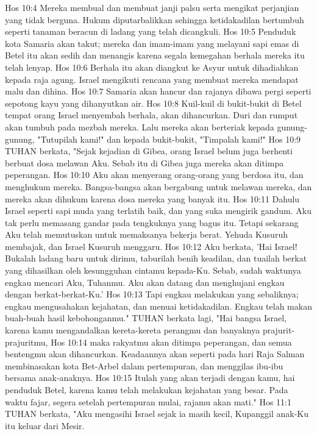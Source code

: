 Hos 10:4  Mereka membual dan membuat janji palsu serta mengikat perjanjian yang tidak berguna. Hukum diputarbalikkan sehingga ketidakadilan bertumbuh seperti tanaman beracun di ladang yang telah dicangkuli.
Hos 10:5  Penduduk kota Samaria akan takut; mereka dan imam-imam yang melayani sapi emas di Betel itu akan sedih dan menangis karena segala kemegahan berhala mereka itu telah lenyap.
Hos 10:6  Berhala itu akan diangkut ke Asyur untuk dihadiahkan kepada raja agung. Israel mengikuti rencana yang membuat mereka mendapat malu dan dihina.
Hos 10:7  Samaria akan hancur dan rajanya dibawa pergi seperti sepotong kayu yang dihanyutkan air.
Hos 10:8  Kuil-kuil di bukit-bukit di Betel tempat orang Israel menyembah berhala, akan dihancurkan. Duri dan rumput akan tumbuh pada mezbah mereka. Lalu mereka akan berteriak kepada gunung-gunung, "Tutupilah kami!" dan kepada bukit-bukit, "Timpalah kami!"
Hos 10:9  TUHAN berkata, "Sejak kejadian di Gibea, orang Israel belum juga berhenti berbuat dosa melawan Aku. Sebab itu di Gibea juga mereka akan ditimpa peperangan.
Hos 10:10  Aku akan menyerang orang-orang yang berdosa itu, dan menghukum mereka. Bangsa-bangsa akan bergabung untuk melawan mereka, dan mereka akan dihukum karena dosa mereka yang banyak itu.
Hos 10:11  Dahulu Israel seperti sapi muda yang terlatih baik, dan yang suka mengirik gandum. Aku tak perlu memasang gandar pada tengkuknya yang bagus itu. Tetapi sekarang Aku telah memutuskan untuk memaksanya bekerja berat. Yehuda Kusuruh membajak, dan Israel Kusuruh menggaru.
Hos 10:12  Aku berkata, 'Hai Israel! Bukalah ladang baru untuk dirimu, taburilah benih keadilan, dan tuailah berkat yang dihasilkan oleh kesungguhan cintamu kepada-Ku. Sebab, sudah waktunya engkau mencari Aku, Tuhanmu. Aku akan datang dan menghujani engkau dengan berkat-berkat-Ku.'
Hos 10:13  Tapi engkau melakukan yang sebaliknya; engkau mengusahakan kejahatan, dan menuai ketidakadilan. Engkau telah makan buah-buah hasil kebohonganmu." TUHAN berkata lagi, "Hai bangsa Israel, karena kamu mengandalkan kereta-kereta perangmu dan banyaknya prajurit-prajuritmu,
Hos 10:14  maka rakyatmu akan ditimpa peperangan, dan semua bentengmu akan dihancurkan. Keadaannya akan seperti pada hari Raja Salman membinasakan kota Bet-Arbel dalam pertempuran, dan menggilas ibu-ibu bersama anak-anaknya.
Hos 10:15  Itulah yang akan terjadi dengan kamu, hai penduduk Betel, karena kamu telah melakukan kejahatan yang besar. Pada waktu fajar, segera setelah pertempuran mulai, rajamu akan mati."
Hos 11:1  TUHAN berkata, "Aku mengasihi Israel sejak ia masih kecil, Kupanggil anak-Ku itu keluar dari Mesir.
